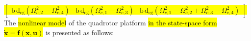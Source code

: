 \documentclass[3p]{elsarticle}
\begin{document}
    \colorbox{yellow}{$\begin{bmatrix}
        \mathrm{b\,d}_{\text{cg}}(\Omega_{c, 2}^2 - \Omega_{c, 4}^2) & \mathrm{b\,d}_{\text{cg}}(\Omega_{c, 1}^2 - \Omega_{c, 3}^2) &
        \mathrm{b\,d}_{\text{cg}}(\Omega_{c, 1}^2 - \Omega_{c, 2}^2+ \Omega_{c, 3}^2 - \Omega_{c, 4}^2)
    \end{bmatrix}$}
    The \hl{nonlinear model} of the quadrotor platform \hl{in the state-space form $\dot{\boldsymbol{x}} = \boldsymbol{f}(\boldsymbol{x}, \boldsymbol{u})$} is presented as follows:
\end{document}
